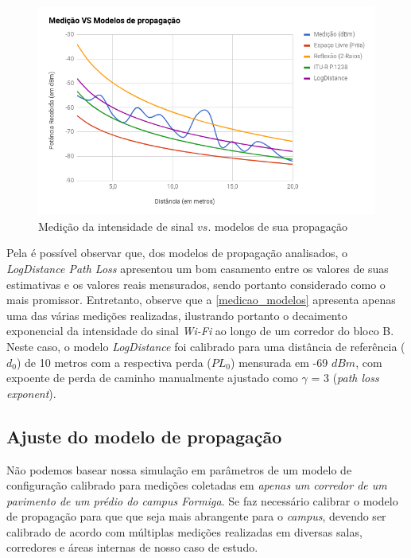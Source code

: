 \documentclass[
	12pt,				%
	twoside,			%
	a4paper,			%
	english,			%
	french,				%
	spanish,			%
	brazil				%
	]{abntex2}
\begin{document}
\begin{figure}[htb]
    \caption{\label{medicao_modelos} Medição da intensidade de sinal $vs.$ modelos de sua propagação}
    \begin{center}
        \includegraphics[scale=0.68]{imagens/medicao-modelos.jpg}
    \end{center}
\end{figure}

Pela é possível observar que, dos modelos de propagação analisados, o
\emph{LogDistance Path Loss} apresentou um bom casamento entre os
valores de suas estimativas e os valores reais mensurados, sendo
portanto considerado como o mais promissor. Entretanto, observe que a
\autoref{medicao_modelos} apresenta apenas uma das várias medições
realizadas, ilustrando portanto o decaimento exponencial da intensidade
do sinal \emph{Wi-Fi} ao longo de um corredor do bloco B. Neste caso, o
modelo \emph{LogDistance} foi calibrado para uma distância de referência
(\(d_{0}\)) de 10 metros com a respectiva perda (\(PL_{0}\)) mensurada
em -69 \(dBm\), com expoente de perda de caminho manualmente ajustado
como \(\gamma\) = 3 (\emph{path loss exponent}).

\subsection{Ajuste do modelo de
propagação}\label{ajuste-do-modelo-de-propagauxe7uxe3o}

Não podemos basear nossa simulação em parâmetros de um modelo de
configuração calibrado para medições coletadas em \emph{apenas um
corredor de um pavimento de um prédio do campus Formiga}. Se faz
necessário calibrar o modelo de propagação para que que seja mais
abrangente para o \emph{campus}, devendo ser calibrado de acordo com
múltiplas medições realizadas em diversas salas, corredores e áreas
internas de nosso caso de estudo.
\end{document}
